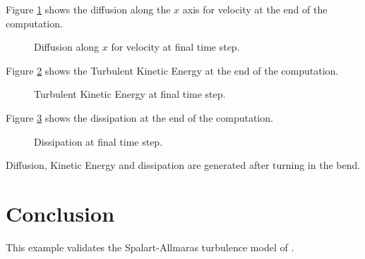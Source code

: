 Figure \ref{t3d:bendrans:NuxVelo} shows the diffusion along the $x$ axis
for velocity at the end of the computation.

\begin{figure}[H]
  \centering
  \caption{Diffusion along $x$ for velocity at final time step.}
  \label{t3d:bendrans:NuxVelo}
\end{figure}

Figure \ref{t3d:bendrans:TKE} shows the Turbulent Kinetic Energy at the end of
the computation.

\begin{figure}[H]
  \centering
  \caption{Turbulent Kinetic Energy at final time step.}
  \label{t3d:bendrans:TKE}
\end{figure}

Figure \ref{t3d:bendrans:Diss} shows the dissipation at the end of
the computation.

\begin{figure}[H]
  \centering
  \caption{Dissipation at final time step.}
  \label{t3d:bendrans:Diss}
\end{figure}

Diffusion, Kinetic Energy and dissipation are generated after turning
in the bend.

\section{Conclusion}

This example validates the Spalart-Allmaras turbulence model of .
